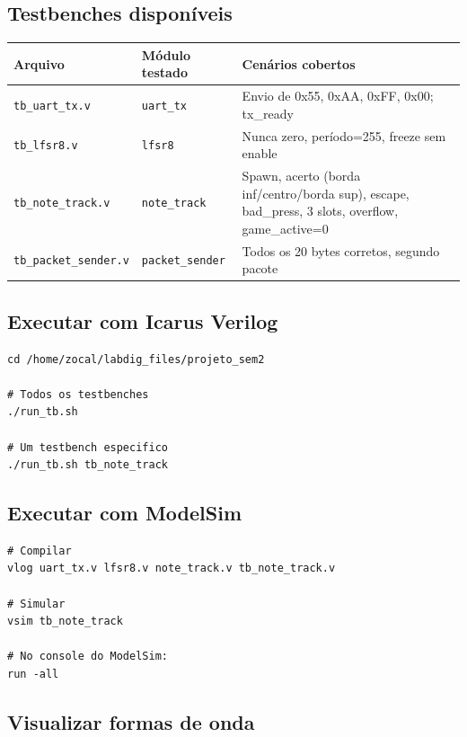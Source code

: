 \documentclass[12pt,a4paper]{article}
\begin{document}
\subsection{Testbenches disponíveis}

\begin{table}[H]
\centering
\begin{tabularx}{\textwidth}{llX}
\toprule
\textbf{Arquivo} & \textbf{Módulo testado} & \textbf{Cenários cobertos} \\
\midrule
\texttt{tb\_uart\_tx.v}      & \texttt{uart\_tx}      & Envio de 0x55, 0xAA, 0xFF, 0x00; tx\_ready \\
\texttt{tb\_lfsr8.v}         & \texttt{lfsr8}         & Nunca zero, período=255, freeze sem enable \\
\texttt{tb\_note\_track.v}   & \texttt{note\_track}   & Spawn, acerto (borda inf/centro/borda sup), escape, bad\_press, 3 slots, overflow, game\_active=0 \\
\texttt{tb\_packet\_sender.v}& \texttt{packet\_sender}& Todos os 20 bytes corretos, segundo pacote \\
\bottomrule
\end{tabularx}
\end{table}

\subsection{Executar com Icarus Verilog}

\begin{lstlisting}[style=shell]
cd /home/zocal/labdig_files/projeto_sem2

# Todos os testbenches
./run_tb.sh

# Um testbench especifico
./run_tb.sh tb_note_track
\end{lstlisting}

\subsection{Executar com ModelSim}

\begin{lstlisting}[style=shell]
# Compilar
vlog uart_tx.v lfsr8.v note_track.v tb_note_track.v

# Simular
vsim tb_note_track

# No console do ModelSim:
run -all
\end{lstlisting}

\subsection{Visualizar formas de onda}
\end{document}
